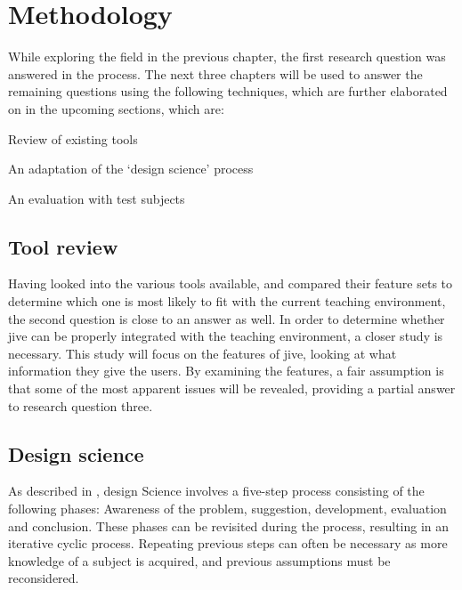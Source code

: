 \chapter{Methodology}\label{methodology}%

While exploring the field in the previous chapter, the first research question was answered in the process.
The next three chapters will be used to answer the remaining questions using the following techniques, which are further elaborated on in the upcoming sections, which are:

\begin{itemize*}
	\item{Review of existing tools}
	\item{An adaptation of the `design science' process}%
	\item{An evaluation with test subjects}
\end{itemize*}

\section{Tool review}\label{methReview}

Having looked into the various tools available, and compared their feature sets to determine which one is most likely to fit with the current teaching environment, the second question is close to an answer as well.
In order to determine whether \gls{jive} can be properly integrated with the teaching environment, a closer study is necessary.
This study will focus on the features of \gls{jive}, looking at what information they give the users.
By examining the features, a fair assumption is that some of the most apparent issues will be revealed, providing a partial answer to research question three.

\section{Design science}\label{methDesign}

As described in \cite{Vaishnavi2004}, design Science involves a five-step process consisting of the following phases: Awareness of the problem, suggestion, development, evaluation and conclusion.
These phases can be revisited during the process, resulting in an iterative cyclic process.
Repeating previous steps can often be necessary as more knowledge of a subject is acquired, and previous assumptions must be reconsidered.

